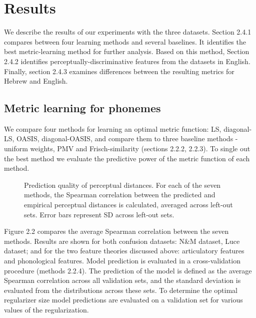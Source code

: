 \section{Results}
We describe the results of our experiments with the three datasets. Section 2.4.1 compares between four learning methods and several baselines. It identifies the best metric-learning method for further analysis. Based on this method, Section 2.4.2 identifies perceptually-discriminative features from the datasets in English. Finally, section 2.4.3 examines differences between the resulting metrics for Hebrew and English.

\subsection{Metric learning for phonemes}
We compare four methods for learning an optimal metric function: LS, diagonal-LS, OASIS, diagonal-OASIS, and compare them to three baseline methods - uniform weights, PMV and Frisch-similarity (sections 2.2.2, 2.2.3). To single out the best method we evaluate the predictive power of the metric function of each method.

\begin{figure}[t]
\vspace{.3in}
\caption{Prediction quality of perceptual distances. For each of the seven methods, the Spearman correlation between the predicted and empirical perceptual distances is calculated, averaged across left-out sets. Error bars represent SD across left-out sets.} 
\end{figure}

Figure 2.2 compares the average Spearman correlation between the seven methods. Results are shown for both confusion datasets: N\&M dataset, Luce dataset; and for the two feature theories discussed above: articulatory features and phonological features. Model prediction is evaluated in a cross-validation procedure (methods 2.2.4). The prediction of the model is defined as the average Spearman correlation across all validation sets, and the standard deviation is evaluated from the distributions across these sets. To determine the optimal regularizer size model predictions are evaluated on a validation set for various values of the regularization.

